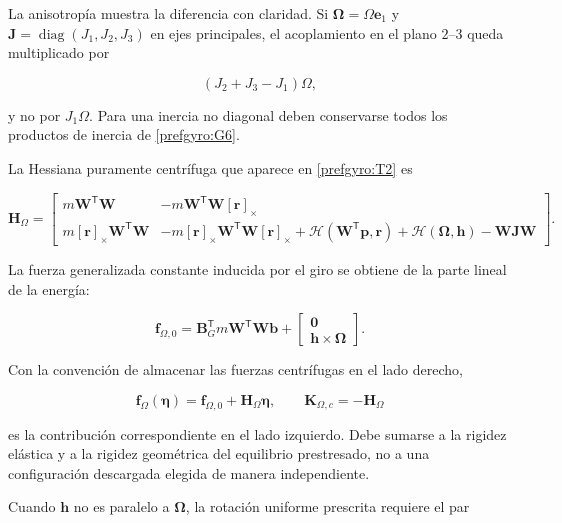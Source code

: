La anisotropía muestra la diferencia con claridad. Si $\bm\Omega=\Omega\bm e_1$
y $\bm J=\operatorname{diag}(J_1,J_2,J_3)$ en ejes principales, el acoplamiento
en el plano $2$--$3$ queda multiplicado por

\begin{equation}
 (J_2+J_3-J_1)\Omega,
 \label{prefgyro:principal}
\end{equation}

y no por $J_1\Omega$. Para una inercia no diagonal deben conservarse todos los
productos de inercia de \eqref{prefgyro:G6}.

La Hessiana puramente centrífuga que aparece en \eqref{prefgyro:T2} es

\begin{equation}
 \bm H_\Omega
 =\begin{bmatrix}
 m\bm W^{\mathsf T}\bm W&
 -m\bm W^{\mathsf T}\bm W[\bm r]_\times\\
 m[\bm r]_\times\bm W^{\mathsf T}\bm W&
 -m[\bm r]_\times\bm W^{\mathsf T}\bm W[\bm r]_\times
 +\mathcal H(\bm W^{\mathsf T}\bm p,\bm r)
 +\mathcal H(\bm\Omega,\bm h)
 -\bm W\bm J\bm W
 \end{bmatrix}.
 \label{prefgyro:HOmega}
\end{equation}

La fuerza generalizada constante inducida por el giro se obtiene de la parte
lineal de la energía:

\begin{equation}
 \bm f_{\Omega,0}
 =\bm B_G^{\mathsf T}m\bm W^{\mathsf T}\bm W\bm b
 +\begin{bmatrix}\bm 0\\ \bm h\times\bm\Omega\end{bmatrix}.
 \label{prefgyro:fcentrif}
\end{equation}

Con la convención de almacenar las fuerzas centrífugas en el lado derecho,

\begin{equation}
 \bm f_\Omega(\bm\eta)
 =\bm f_{\Omega,0}+\bm H_\Omega\bm\eta,
 \qquad
 \bm K_{\Omega,c}=-\bm H_\Omega
 \label{prefgyro:KOmega}
\end{equation}

es la contribución correspondiente en el lado izquierdo. Debe sumarse a la
rigidez elástica y a la rigidez geométrica del equilibrio prestresado, no a una
configuración descargada elegida de manera independiente.

Cuando $\bm h$ no es paralelo a $\bm\Omega$, la rotación uniforme prescrita
requiere el par

